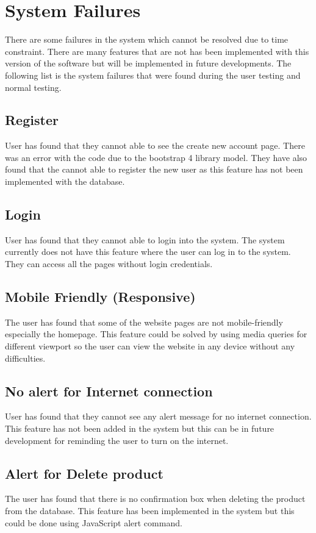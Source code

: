 \section{System Failures}
There are some failures in the system which cannot be resolved due to time constraint. There are many features that are not has been implemented with this version of the software but will be implemented in future developments. The following list is the system failures that were found during the user testing and normal testing.

\subsection{Register}
User has found that they cannot able to see the create new account page. There was an error with the code due to the bootstrap 4 library model. They have also found that the cannot able to register the new user as this feature has not been implemented with the database.

\subsection{Login}
User has found that they cannot able to login into the system. The system currently does not have this feature where the user can log in to the system. They can access all the pages without login credentials.

\subsection{Mobile Friendly (Responsive)}
The user has found that some of the website pages are not mobile-friendly especially the homepage. This feature could be solved by using media queries for different viewport so the user can view the website in any device without any difficulties.

\subsection{No alert for Internet connection}
User has found that they cannot see any alert message for no internet connection. This feature has not been added in the system but this can be in future development for reminding the user to turn on the internet.

\subsection{Alert for Delete product}
The user has found that there is no confirmation box when deleting the product from the database. This feature has been implemented in the system but this could be done using JavaScript alert command. 

